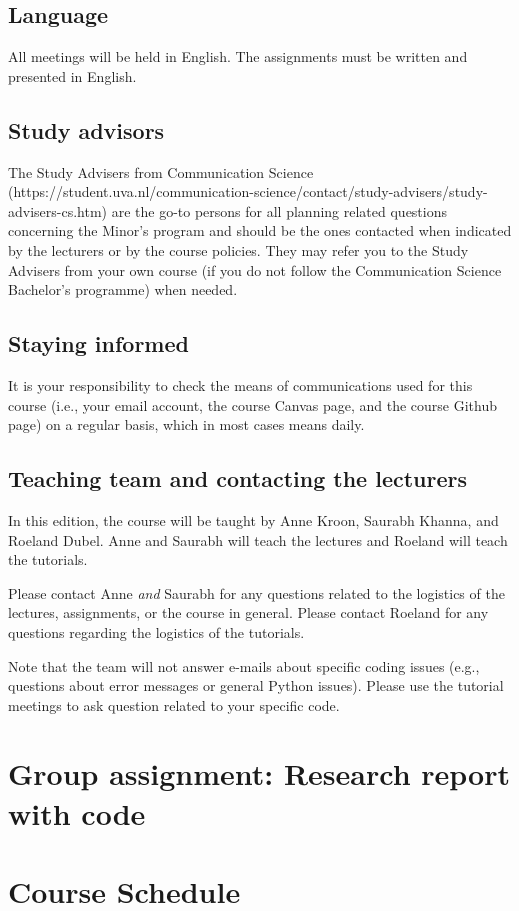 \documentclass[a4paper,10pt]{report}
\begin{document}
\section{Language}
All meetings will be held in English. The assignments must be written and presented in English. 

\section{Study advisors}
The Study Advisers from Communication Science (https://student.uva.nl/communication-science/contact/study-advisers/study-advisers-cs.htm) are the go-to persons for all planning related questions concerning the Minor’s program and should be the ones contacted when indicated by the lecturers or by the course policies. They may refer you to the Study Advisers from your own course (if you do not follow the Communication Science Bachelor’s programme) when needed. 

\section{Staying informed}
It is your responsibility to check the means of communications used for this course (i.e., your email account, the course Canvas page, and the course Github page) on a regular basis, which in most cases means daily. 

\section{Teaching team and contacting the lecturers}
In this edition, the course will be taught by Anne Kroon, Saurabh Khanna, and Roeland Dubel. Anne and Saurabh will teach the lectures and Roeland will teach the tutorials.

Please contact Anne \emph{and} Saurabh for any questions related to the logistics of the lectures, assignments, or the course in general.
Please contact Roeland for any questions regarding the logistics of the tutorials. 

Note that the team will not answer e-mails about specific coding issues (e.g., questions about error messages or general Python issues). Please use the tutorial meetings to ask question related to your specific code.

\chapter{Group assignment: Research report with code}
\label{sec:groupassignment}


\chapter{Course Schedule}





\end{document}
